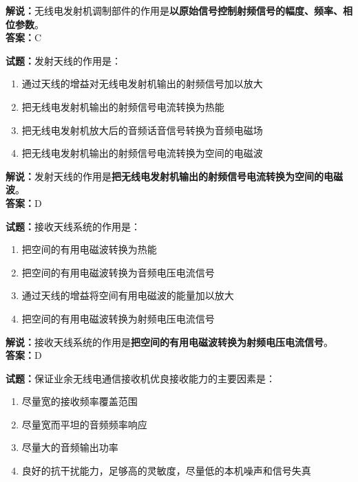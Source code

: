 \documentclass{ctexbook}
\begin{document}
\noindent\textbf{解说：}无线电发射机调制部件的作用是\textbf{以原始信号控制射频信号的幅度、频率、相位参数}。\\\noindent\textbf{答案：}C%

\bigskip

\noindent\textbf{试题：}发射天线的作用是：

\begin{enumerate}[leftmargin=3em]
  \item 通过天线的增益对无线电发射机输出的射频信号加以放大
  \item 把无线电发射机输出的射频信号电流转换为热能
  \item 把无线电发射机放大后的音频话音信号转换为音频电磁场
  \item 把无线电发射机输出的射频信号电流转换为空间的电磁波
\end{enumerate}

\noindent\textbf{解说：}发射天线的作用是\textbf{把无线电发射机输出的射频信号电流转换为空间的电磁波}。\\
\noindent\textbf{答案：}D

\bigskip

\noindent\textbf{试题：}接收天线系统的作用是：

\begin{enumerate}[leftmargin=3em]
  \item 把空间的有用电磁波转换为热能
  \item 把空间的有用电磁波转换为音频电压电流信号
  \item 通过天线的增益将空间有用电磁波的能量加以放大
  \item 把空间的有用电磁波转换为射频电压电流信号
\end{enumerate}

\noindent\textbf{解说：}接收天线系统的作用是\textbf{把空间的有用电磁波转换为射频电压电流信号}。\\\noindent\textbf{答案：}D%

\bigskip

\noindent\textbf{试题：}保证业余无线电通信接收机优良接收能力的主要因素是：

\begin{enumerate}[leftmargin=3em]
  \item 尽量宽的接收频率覆盖范围
  \item 尽量宽而平坦的音频频率响应
  \item 尽量大的音频输出功率
  \item 良好的抗干扰能力，足够高的灵敏度，尽量低的本机噪声和信号失真
\end{enumerate}
\end{document}
